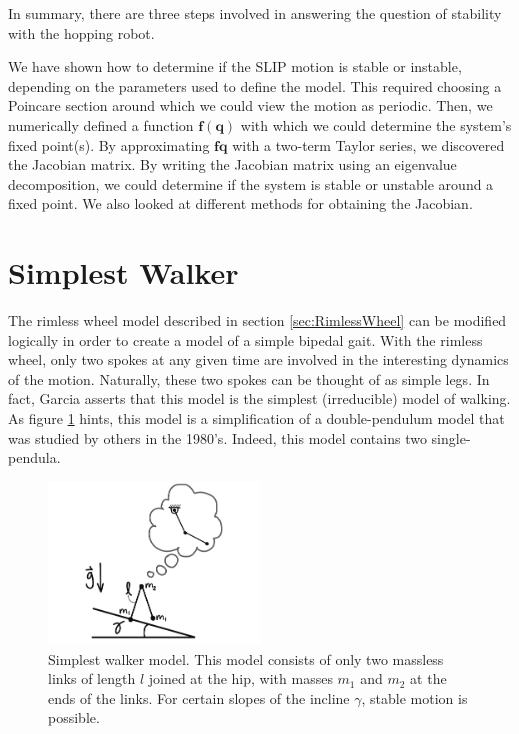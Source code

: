 
In summary, there are three steps involved in answering the question of
stability with the hopping robot.

We have shown how to determine if the SLIP motion is stable or instable,
depending on the parameters used to define the model. This required choosing a
Poincare section around which we could view the motion as periodic. Then, we
numerically defined a function $\mathbf{f}(\mathbf{q})$ with which we could
determine the system's fixed point(s). By approximating
$\mathbf{f}{\mathbf{q}}$ with a two-term Taylor series, we discovered the
Jacobian matrix. By writing the Jacobian matrix using an eigenvalue
decomposition, we could determine if the system is stable or unstable around a
fixed point. We also looked at different methods for obtaining the Jacobian.

\section{Simplest Walker} %
\label{sec:SimplestWalker}



The rimless wheel model described in section \ref{sec:RimlessWheel} can be modified logically in order to create a model of a simple bipedal gait. With the rimless wheel, only two spokes at any given time are involved in the interesting dynamics of the motion. Naturally, these two spokes can be thought of as simple legs. In fact, Garcia \cite{garcia97} asserts that this model is the simplest (irreducible) model of walking. As figure \ref{fig:SimplestWalkerPendulum} hints, this model is a simplification of a double-pendulum model that was studied by 
others in the 1980's. Indeed, this model contains two single-pendula.

\begin{figure}[h]		%
\begin{centering}
\includegraphics[width=0.5\textwidth]{Figures/SimplestWalkerPendulum}\par
\end{centering}
\caption[Diagram: Simplest Walker Model]{Simplest walker model. This model consists of only two massless links of length $l$ joined at the hip, with masses $m_{1}$ and $m_{2}$ at the ends of the links. For certain slopes of the incline $\gamma$, stable motion is possible.}
\label{fig:SimplestWalkerPendulum}
\end{figure}
%


